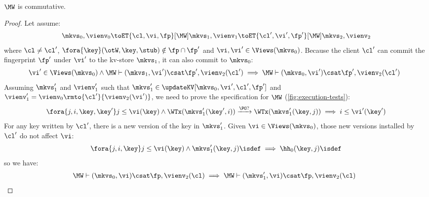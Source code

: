 \begin{lemma}
    \label{lem:mw-comm}
    \(\MW\) is commutative.
\end{lemma}
\begin{proof}
    Let assume:
    \[
        \mkvs_0, \vienv_0 \toET{\cl, \vi, \fp}[\MW] \mkvs_1, \vienv_1 \toET{\cl', \vi', \fp'}[\MW] \mkvs_2, \vienv_2 
    \]
    where \( \cl \neq \cl' \), \( \fora{ \key } (\otW, \key, \stub) \notin \fp \cap \fp' \) and \( \vi, \vi' \in \Views(\mkvs_0)\).
    Because the client \( \cl' \) can commit the fingerprint \( \fp' \) under \( \vi' \) to the kv-store \( \mkvs_1 \), it can also commit to \( \mkvs_0 \):
    \[
        \begin{array}{@{}l}
            \vi' \in \Views(\mkvs_0) \land \MW \vdash (\mkvs_1, \vi') \csat \fp', \vienv_2(\cl') \implies  \MW \vdash (\mkvs_0, \vi') \csat \fp', \vienv_2(\cl')
        \end{array}
    \]
    Assuming \( \mkvs'_1 \) and \( \vienv'_1 \) such that \( \mkvs'_1 \in \updateKV[\mkvs_0,\vi',\cl',\fp'] \) and \( \vienv'_1 = \vienv_0\rmto{\cl'}{\vienv_2(\vi')} \), we need to prove the specification for \( \MW \) (\cref{fig:execution-tests}):
    \[
        \fora{j,i, \key, \key'} j \leq \vi(\key) \wedge \WTx(\mkvs'_1(\key', i)) \xrightarrow{\PO ?} \WTx(\mkvs'_1(\key, j)) \implies i \leq \vi'(\key')  \\
    \]
    For any key written by \( \cl' \), there is a new version of the key in \( \mkvs'_1 \).
    Given \( \vi \in \Views(\mkvs_0)\), those new versions installed by \( \cl' \) do not affect \( \vi \):
    \[
        \fora{j,i, \key} j \leq \vi(\key) \land \mkvs'_1(\key, j)\isdef \implies \hh_0(\key, j)\isdef
    \]
    so we have:
    \[
        \begin{array}{@{}l}
            \MW \vdash (\mkvs_0, \vi) \csat \fp, \vienv_2(\cl) \implies  \MW \vdash (\mkvs'_1, \vi) \csat \fp, \vienv_2(\cl)
        \end{array}
    \]
\end{proof}


